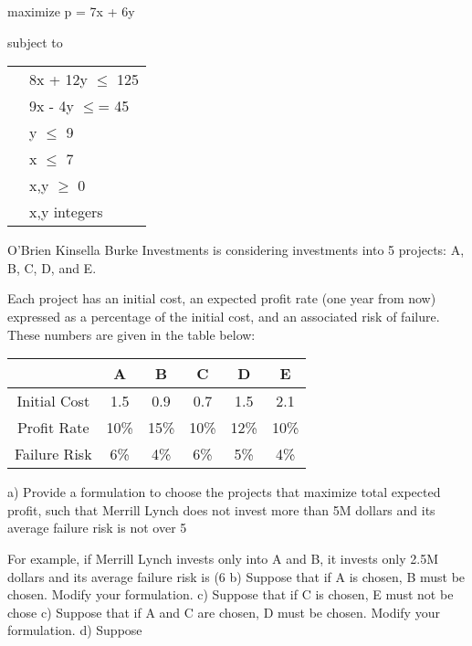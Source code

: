 \documentclass[french]{article}
\begin{document}
maximize p = 7x + 6y 

subject to

\begin{tabular}{cl}

\phantom{space}
& 8x + 12y $\leq$ 125\\
& 9x - 4y $\leq$= 45\\
& y $\leq$ 9\\
& x $\leq$ 7\\
& x,y $\geq$ 0\\
& x,y integers\\

\end{tabular} 


\newpage

O'Brien Kinsella Burke Investments is considering investments into 5 projects: A, B, C, D, and E.

Each project has an initial cost, an expected profit rate (one year from now) expressed as a
percentage of the initial cost, and an associated risk of failure.
These numbers are given in the table below:
\begin{tabular}{|c|c|c|c|c|c|}
	\hline  & A & B & C & D & E \\ 
	\hline Initial Cost & 1.5 & 0.9 & 0.7 & 1.5 & 2.1 \\ 
	\hline Profit Rate & 10\% & 15\% & 10\% & 12\% & 10\% \\ 
		\hline Failure Risk & 6\% & 4\% & 6\% & 5\% & 4\%  \\ 
	\hline 
\end{tabular} 
a) Provide a formulation to choose the projects that maximize total expected profit, such that
Merrill Lynch does not invest more than 5M dollars and its average failure risk is not over
5%

For example, if Merrill Lynch invests only into A and B, it invests only 2.5M dollars and its
average failure risk is (6%
b) Suppose that if A is chosen, B must be chosen. Modify your formulation.
c) Suppose that if C is chosen, E must not be chose
c) Suppose that if A and C are chosen, D must be chosen. Modify your formulation.
d) Suppose
\end{document}
